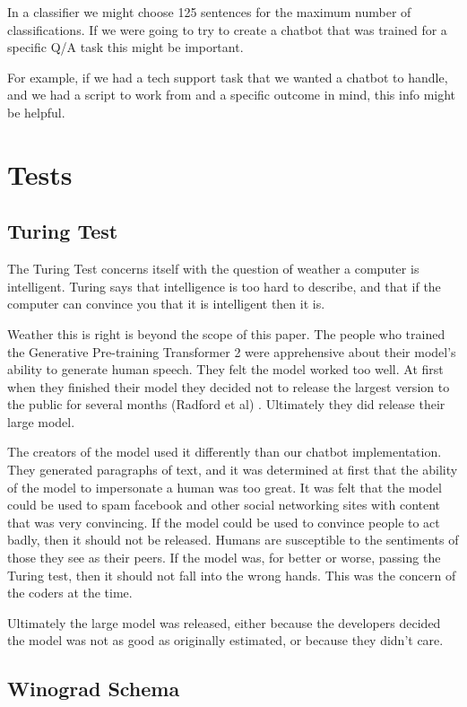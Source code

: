 In a classifier we might choose 125 sentences for the maximum number of classifications. If we were going to try to create a chatbot that was trained for a specific Q/A task this might be important.

For example, if we had a tech support task that we wanted a chatbot to handle, and we had a script to work from and a specific outcome in mind, this info might be helpful.

\section{Tests}

\subsection{Turing Test}

The Turing Test concerns itself with the question of weather a computer is intelligent. Turing says that intelligence is too hard to describe, and that if the computer can convince you that it is intelligent then it is.

Weather this is right is beyond the scope of this paper. The people who trained the Generative Pre-training Transformer 2 were apprehensive about their model's ability to generate human speech. They felt the model worked too well. At first when they finished their model they decided not to release the largest version to the public for several months (Radford et al) \cite{radford2019language}. Ultimately they did release their large model.

The creators of the model used it differently than our chatbot implementation. They generated paragraphs of text, and it was determined at first that the ability of the model to impersonate a human was too great. It was felt that the model could be used to spam facebook and other social networking sites with content that was very convincing. If the model could be used to convince people to act badly, then it should not be released. Humans are susceptible to the sentiments of those they see as their peers. If the model was, for better or worse, passing the Turing test, then it should not fall into the wrong hands. This was the concern of the coders at the time.

Ultimately the large model was released, either because the developers decided the model was not as good as originally estimated, or because they didn't care. 

\subsection{Winograd Schema}

